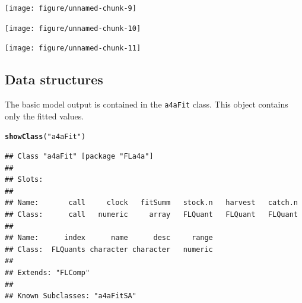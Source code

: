 \documentclass[a4paper,english,10pt]{article}\usepackage[]{graphicx}\usepackage[]{color}
\makeatletter
\newcommand{\hlstr}[1]{\textcolor[rgb]{0.192,0.494,0.8}{#1}}%
\newcommand{\hlstd}[1]{\textcolor[rgb]{0.345,0.345,0.345}{#1}}%
\newcommand{\hlkwd}[1]{\textcolor[rgb]{0.737,0.353,0.396}{\textbf{#1}}}%
\newenvironment{kframe}{%
 \def\at@end@of@kframe{}%
 \ifinner\ifhmode%
  \def\at@end@of@kframe{\end{minipage}}%
  \begin{minipage}{\columnwidth}%
 \fi\fi%
 \def\FrameCommand##1{\hskip\@totalleftmargin \hskip-\fboxsep
 \colorbox{shadecolor}{##1}\hskip-\fboxsep
     \hskip-\linewidth \hskip-\@totalleftmargin \hskip\columnwidth}%
 \MakeFramed {\advance\hsize-\width
   \@totalleftmargin\z@ \linewidth\hsize
   \@setminipage}}%
 {\par\unskip\endMakeFramed%
 \at@end@of@kframe}
\newenvironment{knitrout}{}{} %
\makeatother
\begin{document}
\begin{knitrout}
\color{fgcolor}

{\centering \texttt{[image: figure/unnamed-chunk-9]} 

}



\end{knitrout}


\begin{knitrout}
\color{fgcolor}

{\centering \texttt{[image: figure/unnamed-chunk-10]} 

}



\end{knitrout}


\begin{knitrout}
\color{fgcolor}

{\centering \texttt{[image: figure/unnamed-chunk-11]} 

}



\end{knitrout}


\subsection{Data structures}

The basic model output is contained in the \texttt{a4aFit} class. This object contains only the fitted values.

\begin{knitrout}
\color{fgcolor}\begin{kframe}
\begin{alltt}
\hlkwd{showClass}\hlstd{(}\hlstr{"a4aFit"}\hlstd{)}
\end{alltt}
\begin{verbatim}
## Class "a4aFit" [package "FLa4a"]
## 
## Slots:
##                                                                   
## Name:       call     clock   fitSumm   stock.n   harvest   catch.n
## Class:      call   numeric     array   FLQuant   FLQuant   FLQuant
##                                               
## Name:      index      name      desc     range
## Class:  FLQuants character character   numeric
## 
## Extends: "FLComp"
## 
## Known Subclasses: "a4aFitSA"
\end{verbatim}
\end{kframe}
\end{knitrout}
\end{document}

